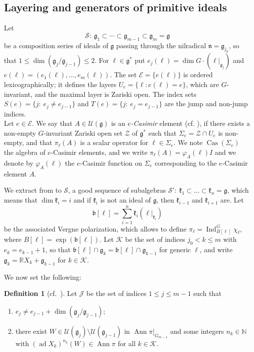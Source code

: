 \documentclass[11pt]{amsart}
\theoremstyle{plain}
\theoremstyle{definition}
\newtheorem{defn}[thm]{Definition}
\theoremstyle{remark}
\newcommand{\g}{\mathfrak g}
\newcommand{\n}{\mathfrak n}
\newcommand{\bb}{\mathfrak b}
\newcommand{\RR}{\mathbb R}
\newcommand{\NN}{\mathbb N}
\newcommand{\ad}{\operatorname{ad}}
\newcommand{\Ann}{\operatorname{Ann}}
\newcommand{\Ind}{\operatorname{Ind}}
\begin{document}
	
	\subsection{Layering and generators of primitive ideals}
	
	Let
	\[
	\mathcal S:\ \g_1\subset\cdots\subset\g_{m-1}\subset\g_m=\g
	\]
	be a composition series of ideals of $\g$ passing through the nilradical $\n=\g_{j_0}$, so that $1\le\dim(\g_j/\g_{j-1})\le2$. For $\ell\in\g^*$ put $e_j(\ell)=\dim G\cdot(\ell|_{\g_j})$ and $e(\ell)=(e_1(\ell),\dots,e_m(\ell))$. The set $\mathcal E=\{e(\ell)\}$ is ordered lexicographically; it defines the layers $U_e=\{\ell: e(\ell)=e\}$, which are $G$-invariant, and the maximal layer is Zariski open. The index sets $S(e)=\{j:\ e_j\neq e_{j-1}\}$ and $T(e)=\{j:\ e_j=e_{j-1}\}$ are the jump and non-jump indices.\\
	
	
		Let $e \in \mathcal E$. We say that $A \in \mathcal U(\mathfrak g)$ is an
\textit{	$e$-Casimir}
	element (cf.  \cite{Bak-Fuji-Casimir}), if there exists a non-empty $G$-invariant Zariski open set $\mathcal Z$ of ${\mathfrak g}^*$
	such that $\Sigma_e = \mathcal Z \cap U_e$ is non-empty, and that ${\pi}_{\ell}(A)$ is a scalar operator for $\ell \in \Sigma_e $.   We note $\operatorname{Cas}(\Sigma_e )$ the algebra of $e$-Casimir elements, and we write ${\pi}_{\ell}(A)
	= {\varphi}_A(\ell)I$ and we denote {by} ${\varphi}_A(\ell)$ the $e$-Casimir function on $\Sigma_e$ corresponding to the $e$-Casimir element $A$.
	
	We extract from to $\mathcal S$,  a good sequence of subalgebras $\mathcal S':\ \mathfrak k_1\subset\dots\subset\mathfrak k_n=\g$, which means that $\dim\mathfrak k_i=i$ and if $\mathfrak k_i$ is not an ideal of $\mathfrak g$, then $\mathfrak k_{i-1}$ and $\mathfrak k_{i+1}$ are.  Let  $$\bb[\ell]=\sum_{i=1}^{n}\mathfrak k_i(\ell\vert_{\mathfrak k_i})$$ be the associated Vergne polarization, which allows to define $\pi_\ell=\Ind_{B[\ell]}^G\chi_\ell$, where $B[\ell]=\exp(\bb[\ell])$. Let $\mathcal K$ be the set of indices $j_0<k\le m$ with $e_k=e_{k-1}+1$, so that $\bb[\ell]\cap\g_k=\bb[\ell]\cap\g_{k-1}$ for generic $\ell$, and write $\g_k=\RR X_k+\g_{k-1}$ for $k\in\mathcal K$.
	
	We now set the following:
	
	\begin{defn}[cf.~\cite{Bak-Fuji-Casimir}]\label{def:J}
		Let $\mathcal J$ be the set of indices $1\le j\le m-1$ such that
		\begin{enumerate}
			\item $e_j\neq e_{j-1}+\dim(\g_j/\g_{j-1})$;
			\item there exist $W\in\mathcal U(\g_j)\setminus\mathcal U(\g_{j-1})$ in $\Ann\pi|_{G_{m-1}}$ and some integers $n_k\in\NN$ with $(\ad X_k)^{n_k}(W)\in\Ann\pi$ for all $k\in\mathcal K$.
		\end{enumerate}
	\end{defn}
	
\end{document}

